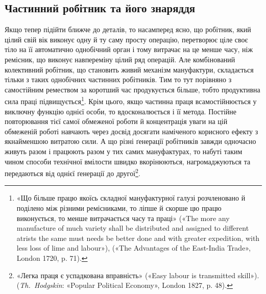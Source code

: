 
\subsection{Частинний робітник та його знаряддя}

Якщо тепер підійти ближче до деталів, то насамперед ясно,
що робітник, який цілий свій вік виконує одну й ту саму просту
операцію, перетворює ціле своє тіло на її автоматично однобічний
орган і тому витрачає на це менше часу, ніж ремісник, що
виконує навпереміну цілий ряд операцій. Але комбінований
колективний робітник, що становить живий механізм мануфактури,
складається тільки з таких однобічних частинних робітників.
Тим то тут порівняно з самостійним ремеством за коротший
час продукується більше, тобто продуктивна сила праці підвищується\footnote{
«Що більше працю якоїсь складної мануфактурної галузі розчленовано
й поділено між різними ремісниками, то ліпше й скорше цю працю виконується,
то менше витрачається часу та праці» («The more any manufacture
of much variety shall be distributed and assigned to different atrists
the same must needs be better done and with greater expedition, with less
loss of lime and labour»), («The Advantages of the East-India Trade»,
London 1720, p. 71).
}.
Крім цього, якщо частинна праця всамостійнюється
у виключну функцію однієї особи, то вдосконалюється і її метода.
Постійне повторювання тієї самої обмеженої роботи й концентрація
уваги на цій обмеженій роботі навчають через досвід досягати
наміченого корисного ефекту з якнайменшою витратою сили.
А що різні ґенерації робітників завжди одночасно живуть разом
і працюють разом у тих самих мануфактурах, то набуті таким
чином способи технічної вмілости швидко вкорінюються, нагромаджуються
та передаються від однієї ґенерації до другої\footnote{
«Легка праця є успадкована вправність» («Easy labour is transmitted
skill»). (\emph{Th.~Hodgskin}: «Popular Political Economy», London 1827, p. 48).
}.

